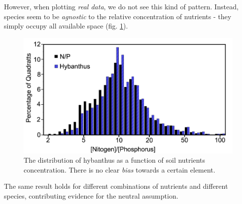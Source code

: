 \documentclass[../../main.tex]{subfiles}
\begin{document}
However, when plotting \textit{real data}, we do not see this kind of pattern. Instead, species seem to be \textit{agnostic} to the relative concentration of nutrients - they simply occupy all available space (fig. \ref{fig:hybanthus}).

\begin{figure}[H]
    \centering
    \includegraphics[width=\textwidth]{hybanthus.png}
    \caption{The distribution of hybanthus as a function of soil nutrients concentration. There is no clear \textit{bias} towards a certain element.}
    \label{fig:hybanthus}
\end{figure}

The same result holds for different combinations of nutrients and different species, contributing evidence for the neutral assumption.

\medskip
\end{document}

